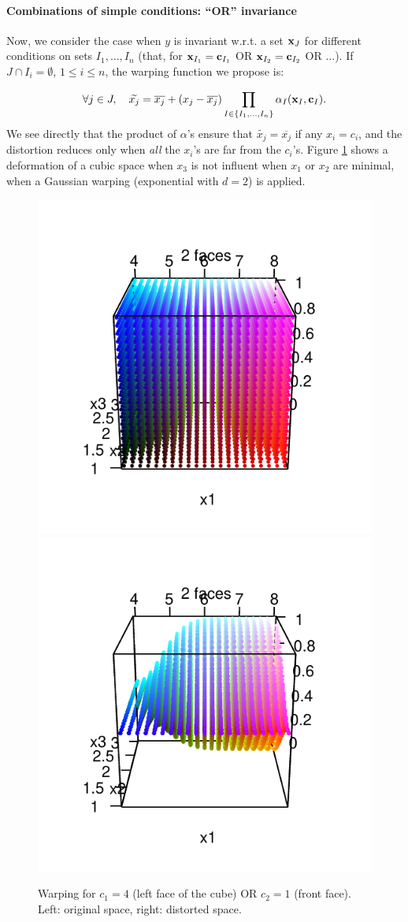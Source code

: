 \paragraph{Combinations of simple conditions: ``OR'' invariance}
Now, we consider the case when $y$ is invariant w.r.t. a set $\mathbf{x}_J$ for different conditions on sets $I_1, \ldots, I_n$
(that, for $\mathbf{x}_{I_1}=\mathbf{c}_{I_1}$ OR $\mathbf{x}_{I_2}=\mathbf{c}_{I_2}$ OR $\ldots$).
If $J\cap I_i=\emptyset$, $1 \leq i \leq n$, the warping function we propose is:

\begin{equation}
 \forall j \in J, \quad \widetilde{x_j} = \overline{x_j} + \left( x_j - \overline{x_j}\right) \prod_{I \in \{I_1, \ldots, I_n \}}{\alpha_I}(\x_I, \cc_I)\label{eq:or0}. %
\end{equation}
% 
We see directly that the product of $\alpha$'s ensure that $\widetilde{x_j} = \overline{x_j}$
if any $x_i = c_i$, and the distortion reduces only when \emph{all} the $x_i$'s are far from the $c_i$'s.
Figure \ref{fig:def3DORs} shows a deformation of a cubic space when $x_3$ is not influent when $x_1$ or $x_2$ are minimal, when a Gaussian warping (exponential with $d=2$) is applied.
 \begin{figure}[!ht]
 \centering
 \includegraphics[width=.4\textwidth]{def3DORs.pdf}
 \includegraphics[width=.4\textwidth]{def3DOR2s.pdf}
 \caption{Warping for $c_1=4$ (left face of the cube) OR $c_2=1$ (front face). Left: original space, right: distorted space. %
 }\label{fig:def3DORs}
\end{figure}

